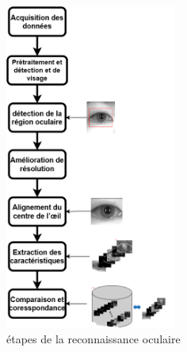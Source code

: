 \begin{figure}[htbp]
    \centering
    \includegraphics[width=0.5\textwidth ]{img/Diagramme sans nom.drawio.png}
    \caption{étapes de la reconnaissance oculaire}

\end{figure}

